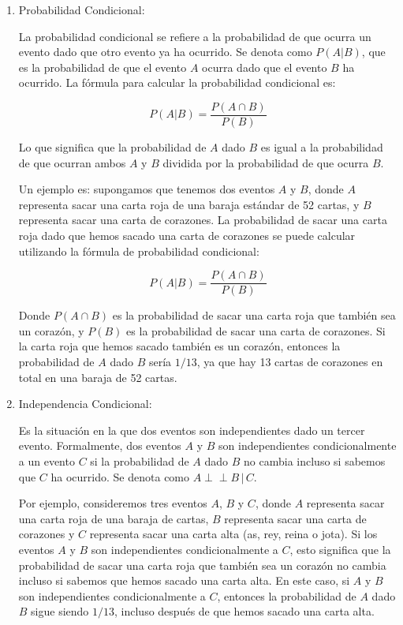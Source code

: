 \begin{enumerate}
    \item Probabilidad Condicional:

La probabilidad condicional se refiere a la probabilidad de que ocurra un evento dado que otro evento ya ha ocurrido. Se denota como \( P(A | B) \), que es la probabilidad de que el evento \( A \) ocurra dado que el evento \( B \) ha ocurrido. La fórmula para calcular la probabilidad condicional es:

\[ P(A | B) = \frac{P(A \cap B)}{P(B)} \]

Lo que significa que la probabilidad de \( A \) dado \( B \) es igual a la probabilidad de que ocurran ambos \( A \) y \( B \) dividida por la probabilidad de que ocurra \( B \).

Un ejemplo es: supongamos que tenemos dos eventos \( A \) y \( B \), donde \( A \) representa sacar una carta roja de una baraja estándar de 52 cartas, y \( B \) representa sacar una carta de corazones. La probabilidad de sacar una carta roja dado que hemos sacado una carta de corazones se puede calcular utilizando la fórmula de probabilidad condicional:

\[ P(A | B) = \frac{P(A \cap B)}{P(B)} \]

Donde \( P(A \cap B) \) es la probabilidad de sacar una carta roja que también sea un corazón, y \( P(B) \) es la probabilidad de sacar una carta de corazones. Si la carta roja que hemos sacado también es un corazón, entonces la probabilidad de \( A \) dado \( B \) sería \( 1/13 \), ya que hay 13 cartas de corazones en total en una baraja de 52 cartas.

\item Independencia Condicional:

Es la situación en la que dos eventos son independientes dado un tercer evento. Formalmente, dos eventos \( A \) y \( B \) son independientes condicionalmente a un evento \( C \) si la probabilidad de \( A \) dado \( B \) no cambia incluso si sabemos que \( C \) ha ocurrido. Se denota como \( A \perp\!\!\!\perp B \,|\, C \).

Por ejemplo, consideremos tres eventos \( A \), \( B \) y \( C \), donde \( A \) representa sacar una carta roja de una baraja de cartas, \( B \) representa sacar una carta de corazones y \( C \) representa sacar una carta alta (as, rey, reina o jota). Si los eventos \( A \) y \( B \) son independientes condicionalmente a \( C \), esto significa que la probabilidad de sacar una carta roja que también sea un corazón no cambia incluso si sabemos que hemos sacado una carta alta. En este caso, si \( A \) y \( B \) son independientes condicionalmente a \( C \), entonces la probabilidad de \( A \) dado \( B \) sigue siendo \( 1/13 \), incluso después de que hemos sacado una carta alta.


\end{enumerate}
